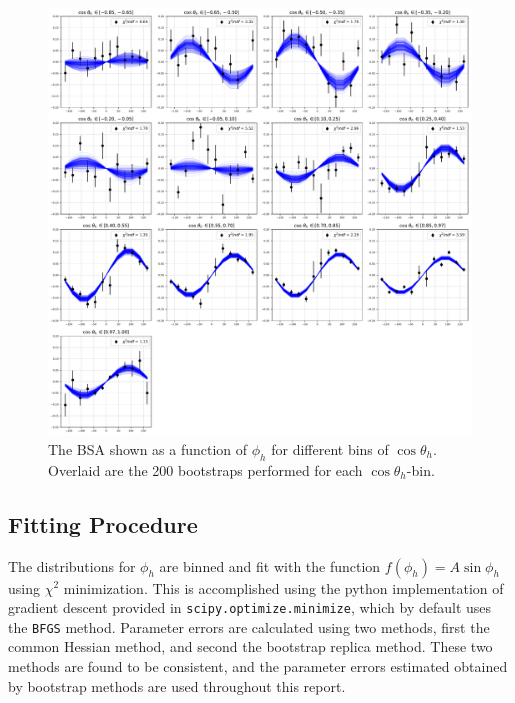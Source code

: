 \begin{figure}
  \begin{center}
    \includegraphics[width=14cm]{image/default_phi_bootstraps.pdf}
    \caption{The BSA shown as a function of $\phi_h$ for different bins of $\cos \theta_h$.  Overlaid are the 200 bootstraps performed for each $\cos \theta_h$-bin.}
  \end{center}
\end{figure}

\subsection{Fitting Procedure}
The distributions for $\phi_h$ are binned and fit with the function $f(\phi_h) = A\sin{\phi_h}$ using $\chi^2$ minimization.  This is accomplished using the python implementation of gradient descent provided in \texttt{scipy.optimize.minimize}, which by default uses the \texttt{BFGS} method.  Parameter errors are calculated using two methods, first the common Hessian method, and second the bootstrap replica method.  These two methods are found to be consistent, and the parameter errors estimated obtained by bootstrap methods are used throughout this report.   
\\    

